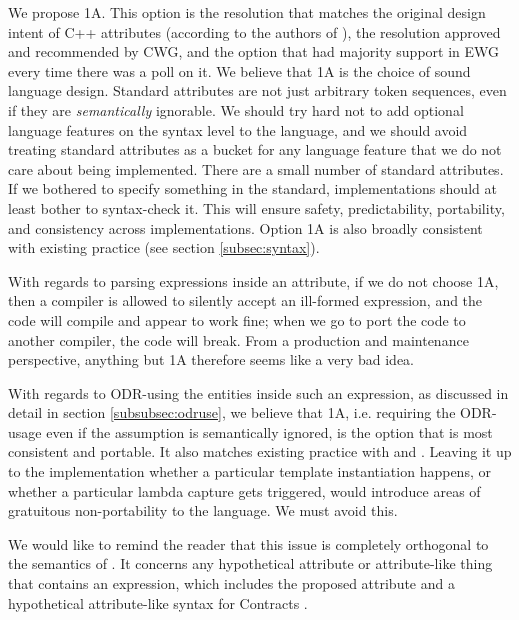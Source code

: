 We propose 1A. This option is the resolution that matches the original design intent of C++ attributes (according to the authors of \cite{N2761}), the resolution approved and recommended by CWG, and the option that had majority support in EWG every time there was a poll on it. We believe that 1A is the choice of sound language design. Standard attributes are not just arbitrary token sequences, even if they are \emph{semantically} ignorable. We should try hard not to add optional language features on the syntax level to the language, and we should avoid treating standard attributes as a bucket for any language feature that we do not care about being implemented. There are a small number of standard attributes. If we bothered to specify something in the standard, implementations should at least bother to syntax-check it. This will ensure safety, predictability, portability, and consistency across implementations. Option 1A is also broadly consistent with existing practice (see section \ref{subsec:syntax}). 

With regards to parsing expressions inside an attribute, if we do not choose 1A, then a compiler is allowed to silently accept an ill-formed expression, and the code will compile and appear to work fine; when we go to port the code to another compiler, the code will break. From a production and maintenance perspective, anything but 1A therefore seems like a very bad idea. 
 
With regards to ODR-using the entities inside such an expression, as discussed in detail in section \ref{subsubsec:odruse}, we believe that 1A, i.e. requiring the ODR-usage even if the assumption is semantically ignored, is the option that is most consistent and portable. It also matches existing practice with  and . Leaving it up to the implementation whether a particular template instantiation happens, or whether a particular lambda capture gets triggered, would introduce areas of gratuitous non-portability to the language. We must avoid this. 

We would like to remind the reader that this issue is completely orthogonal to the semantics of . It concerns any hypothetical attribute or attribute-like thing that contains an expression, which includes the proposed  attribute \cite{P1144R5} and a hypothetical attribute-like syntax for Contracts \cite{P2487R0}.
 

